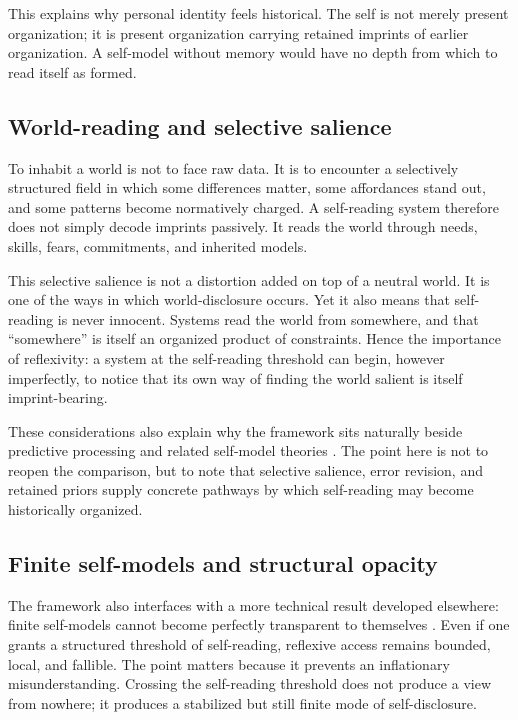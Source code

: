 \documentclass[12pt,a4paper]{article}
\begin{document}
This explains why personal identity feels historical. The self is not merely present organization; it is present organization carrying retained imprints of earlier organization. A self-model without memory would have no depth from which to read itself as formed.

\subsection{World-reading and selective salience}

To inhabit a world is not to face raw data. It is to encounter a selectively structured field in which some differences matter, some affordances stand out, and some patterns become normatively charged. A self-reading system therefore does not simply decode imprints passively. It reads the world through needs, skills, fears, commitments, and inherited models.

This selective salience is not a distortion added on top of a neutral world. It is one of the ways in which world-disclosure occurs. Yet it also means that self-reading is never innocent. Systems read the world from somewhere, and that ``somewhere'' is itself an organized product of constraints. Hence the importance of reflexivity: a system at the self-reading threshold can begin, however imperfectly, to notice that its own way of finding the world salient is itself imprint-bearing.

These considerations also explain why the framework sits naturally beside predictive processing and related self-model theories \cite{Friston2010,Clark2013,Rosenthal2005,LauRosenthal2011}. The point here is not to reopen the comparison, but to note that selective salience, error revision, and retained priors supply concrete pathways by which self-reading may become historically organized.

\subsection{Finite self-models and structural opacity}

The framework also interfaces with a more technical result developed elsewhere: finite self-models cannot become perfectly transparent to themselves \cite{Liu2026CS_III}. Even if one grants a structured threshold of self-reading, reflexive access remains bounded, local, and fallible. The point matters because it prevents an inflationary misunderstanding. Crossing the self-reading threshold does not produce a view from nowhere; it produces a stabilized but still finite mode of self-disclosure.
\end{document}

